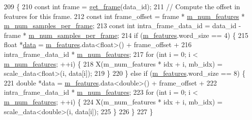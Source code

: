 \begin{DoxyCode}
209                                                          \{
210   \textcolor{keyword}{const} \textcolor{keywordtype}{int} frame = \hyperlink{classlbann_1_1pilot2__molecular__reader_ac95223a0829a83a5d400c4d66efdcb93}{get\_frame}(data\_id);
211   \textcolor{comment}{// Compute the offset in features for this frame.}
212   \textcolor{keyword}{const} \textcolor{keywordtype}{int} frame\_offset = frame * \hyperlink{classlbann_1_1pilot2__molecular__reader_a7fd7dac6f280fd8ef92bd5d2ffc89e36}{m\_num\_features} * 
      \hyperlink{classlbann_1_1pilot2__molecular__reader_a1aa5896276d8a0576f7b3c2b955130be}{m\_num\_samples\_per\_frame};
213   \textcolor{keyword}{const} \textcolor{keywordtype}{int} intra\_frame\_data\_id = data\_id - frame * \hyperlink{classlbann_1_1pilot2__molecular__reader_a1aa5896276d8a0576f7b3c2b955130be}{m\_num\_samples\_per\_frame};
214   \textcolor{keywordflow}{if} (\hyperlink{classlbann_1_1pilot2__molecular__reader_a6b273890ecd01754e21be87da68b57bc}{m\_features}.word\_size == 4) \{
215     \textcolor{keywordtype}{float} *\hyperlink{namespacelbann_1_1cnpy__utils_a9ac86d96ccb1f8b4b2ea16441738781f}{data} = \hyperlink{classlbann_1_1pilot2__molecular__reader_a6b273890ecd01754e21be87da68b57bc}{m\_features}.data<\textcolor{keywordtype}{float}>() + frame\_offset +
216       intra\_frame\_data\_id * \hyperlink{classlbann_1_1pilot2__molecular__reader_a7fd7dac6f280fd8ef92bd5d2ffc89e36}{m\_num\_features};
217     \textcolor{keywordflow}{for} (\textcolor{keywordtype}{int} i = 0; i < \hyperlink{classlbann_1_1pilot2__molecular__reader_a7fd7dac6f280fd8ef92bd5d2ffc89e36}{m\_num\_features}; ++i) \{
218       X(m\_num\_features * idx + i, mb\_idx) = scale\_data<float>(i, data[i]);
219     \}
220   \} \textcolor{keywordflow}{else} \textcolor{keywordflow}{if} (\hyperlink{classlbann_1_1pilot2__molecular__reader_a6b273890ecd01754e21be87da68b57bc}{m\_features}.word\_size == 8) \{
221     \textcolor{keywordtype}{double} *data = \hyperlink{classlbann_1_1pilot2__molecular__reader_a6b273890ecd01754e21be87da68b57bc}{m\_features}.data<\textcolor{keywordtype}{double}>() + frame\_offset +
222       intra\_frame\_data\_id * \hyperlink{classlbann_1_1pilot2__molecular__reader_a7fd7dac6f280fd8ef92bd5d2ffc89e36}{m\_num\_features};
223     \textcolor{keywordflow}{for} (\textcolor{keywordtype}{int} i = 0; i < \hyperlink{classlbann_1_1pilot2__molecular__reader_a7fd7dac6f280fd8ef92bd5d2ffc89e36}{m\_num\_features}; ++i) \{
224       X(m\_num\_features * idx + i, mb\_idx) = scale\_data<double>(i, data[i]);
225     \}
226   \}
227 \}
\end{DoxyCode}

